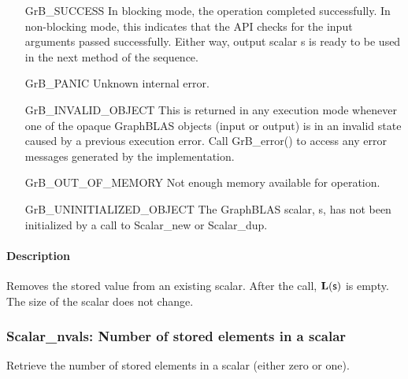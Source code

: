 \begin{itemize}[leftmargin=2.1in]
    \item[{\sf GrB\_SUCCESS}]         In blocking mode, the operation completed
    successfully. In non-blocking mode, this indicates that the API checks 
    for the input arguments passed successfully. Either way, output scalar 
    {\sf s} is ready to be used in the next method of the sequence.

    \item[{\sf GrB\_PANIC}]           Unknown internal error.
    
    \item[{\sf GrB\_INVALID\_OBJECT}] This is returned in any execution mode 
    whenever one of the opaque GraphBLAS objects (input or output) is in an invalid 
    state caused by a previous execution error.  Call {\sf GrB\_error()} to access 
    any error messages generated by the implementation.

    \item[{\sf GrB\_OUT\_OF\_MEMORY}] Not enough memory available for operation.
    
    \item[{\sf GrB\_UNINITIALIZED\_OBJECT}]  The GraphBLAS scalar, {\sf s}, has 
    not been initialized by a call to {\sf Scalar\_new} or {\sf Scalar\_dup}.
    
\end{itemize}

\paragraph{Description}

Removes the stored value from an existing scalar. After the call, 
$\mathbf{L}({\sf s})$ is empty. The size of the scalar does not change. 


\subsubsection{{\sf Scalar\_nvals}: Number of stored elements in a scalar}
\label{Sec:Scalar_nvals}

Retrieve the number of stored elements in a scalar (either zero or one).

\paragraph{\syntax}

